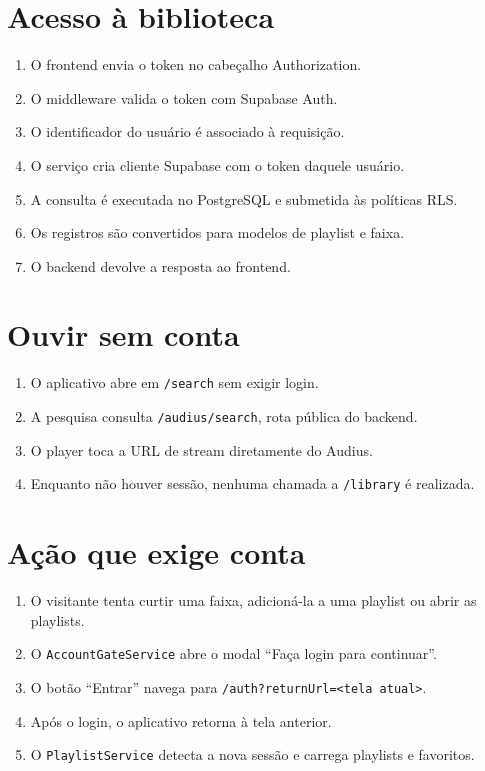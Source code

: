 \documentclass[12pt,a4paper,oneside]{report}
\begin{document}
\section{Acesso à biblioteca}
\begin{enumerate}
\item O frontend envia o token no cabeçalho Authorization.
\item O middleware valida o token com Supabase Auth.
\item O identificador do usuário é associado à requisição.
\item O serviço cria cliente Supabase com o token daquele usuário.
\item A consulta é executada no PostgreSQL e submetida às políticas RLS.
\item Os registros são convertidos para modelos de playlist e faixa.
\item O backend devolve a resposta ao frontend.
\end{enumerate}

\section{Ouvir sem conta}
\begin{enumerate}
\item O aplicativo abre em \texttt{/search} sem exigir login.
\item A pesquisa consulta \texttt{/audius/search}, rota pública do backend.
\item O player toca a URL de stream diretamente do Audius.
\item Enquanto não houver sessão, nenhuma chamada a \texttt{/library} é realizada.
\end{enumerate}

\section{Ação que exige conta}
\begin{enumerate}
\item O visitante tenta curtir uma faixa, adicioná-la a uma playlist ou abrir as playlists.
\item O \texttt{AccountGateService} abre o modal ``Faça login para continuar''.
\item O botão ``Entrar'' navega para \texttt{/auth?returnUrl=<tela atual>}.
\item Após o login, o aplicativo retorna à tela anterior.
\item O \texttt{PlaylistService} detecta a nova sessão e carrega playlists e favoritos.
\end{enumerate}
\end{document}
